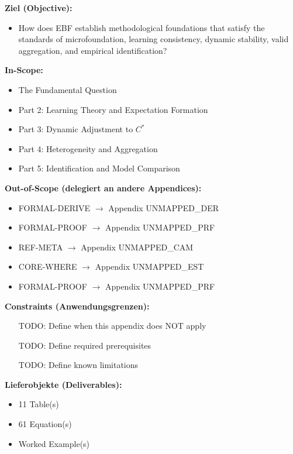 \begin{tcolorbox}[
    colback=orange!5!white,
    colframe=orange!75!black,
    title={\textbf{Appendix Scope: Ziel / In-Scope / Out-of-Scope / Constraints}},
    fonttitle=\bfseries
]

\textbf{Ziel (Objective):}
\begin{itemize}[nosep]
    \item How does EBF establish methodological foundations that satisfy
the standards of microfoundation, learning consistency, dynamic stability,
valid aggregation, and empirical identification?
\end{itemize}

\textbf{In-Scope:}
\begin{itemize}[nosep]
    \item The Fundamental Question
    \item Part 2: Learning Theory and Expectation Formation
    \item Part 3: Dynamic Adjustment to $C^*$
    \item Part 4: Heterogeneity and Aggregation
    \item Part 5: Identification and Model Comparison
\end{itemize}

\textbf{Out-of-Scope (delegiert an andere Appendices):}
\begin{itemize}[nosep]
    \item FORMAL-DERIVE $\rightarrow$ Appendix UNMAPPED_DER
    \item FORMAL-PROOF $\rightarrow$ Appendix UNMAPPED_PRF
    \item REF-META $\rightarrow$ Appendix UNMAPPED_CAM
    \item CORE-WHERE $\rightarrow$ Appendix UNMAPPED_EST
    \item FORMAL-PROOF $\rightarrow$ Appendix UNMAPPED_PRF
\end{itemize}

\textbf{Constraints (Anwendungsgrenzen):}
\begin{itemize}[nosep]
    \item [TODO: Define when this appendix does NOT apply]
    \item [TODO: Define required prerequisites]
    \item [TODO: Define known limitations]
\end{itemize}

\textbf{Lieferobjekte (Deliverables):}
\begin{itemize}[nosep]
    \item 11 Table(s)
    \item 61 Equation(s)
    \item Worked Example(s)
\end{itemize}

\end{tcolorbox}


